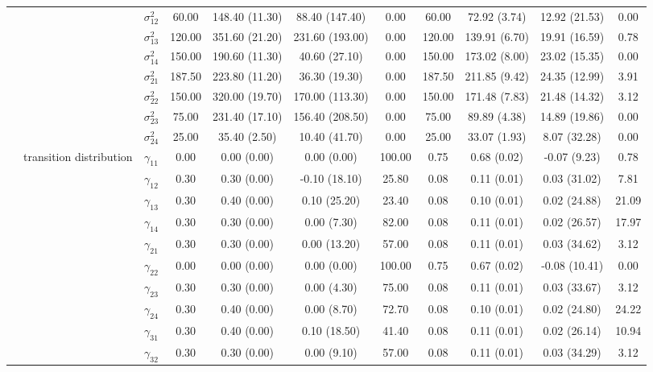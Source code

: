 \begin{table}[h]
{\begin{tabular}{ccccccccccc}
 &  & $\sigma^2_{12}$ & 60.00 & 148.40 (11.30) & 88.40 (147.40) & 0.00 & 60.00 & 72.92 (3.74) & 12.92 (21.53) & 0.00 \\
 &  & $\sigma^2_{13}$ & 120.00 & 351.60 (21.20) & 231.60 (193.00) & 0.00 & 120.00 & 139.91 (6.70) & 19.91 (16.59) & 0.78 \\
 &  & $\sigma^2_{14}$ & 150.00 & 190.60 (11.30) & 40.60 (27.10) & 0.00 & 150.00 & 173.02 (8.00) & 23.02 (15.35) & 0.00 \\
 &  & $\sigma^2_{21}$ & 187.50 & 223.80 (11.20) & 36.30 (19.30) & 0.00 & 187.50 & 211.85 (9.42) & 24.35 (12.99) & 3.91 \\
 &  & $\sigma^2_{22}$ & 150.00 & 320.00 (19.70) & 170.00 (113.30) & 0.00 & 150.00 & 171.48 (7.83) & 21.48 (14.32) & 3.12 \\
 &  & $\sigma^2_{23}$ & 75.00 & 231.40 (17.10) & 156.40 (208.50) & 0.00 & 75.00 & 89.89 (4.38) & 14.89 (19.86) & 0.00 \\
 &  & $\sigma^2_{24}$ & 25.00 & 35.40 (2.50) & 10.40 (41.70) & 0.00 & 25.00 & 33.07 (1.93) & 8.07 (32.28) & 0.00 \\
 & transition distribution & $\gamma_{11}$ & 0.00 & 0.00 (0.00) & 0.00 (0.00) & 100.00 & 0.75 & 0.68 (0.02) & -0.07 (9.23) & 0.78 \\
 & \multirow{15}{*}{} & $\gamma_{12}$ & 0.30 & 0.30 (0.00) & -0.10 (18.10) & 25.80 & 0.08 & 0.11 (0.01) & 0.03 (31.02) & 7.81 \\
 &  & $\gamma_{13}$ & 0.30 & 0.40 (0.00) & 0.10 (25.20) & 23.40 & 0.08 & 0.10 (0.01) & 0.02 (24.88) & 21.09 \\
 &  & $\gamma_{14}$ & 0.30 & 0.30 (0.00) & 0.00 (7.30) & 82.00 & 0.08 & 0.11 (0.01) & 0.02 (26.57) & 17.97 \\
 &  & $\gamma_{21}$ & 0.30 & 0.30 (0.00) & 0.00 (13.20) & 57.00 & 0.08 & 0.11 (0.01) & 0.03 (34.62) & 3.12 \\
 &  & $\gamma_{22}$ & 0.00 & 0.00 (0.00) & 0.00 (0.00) & 100.00 & 0.75 & 0.67 (0.02) & -0.08 (10.41) & 0.00 \\
 &  & $\gamma_{23}$ & 0.30 & 0.30 (0.00) & 0.00 (4.30) & 75.00 & 0.08 & 0.11 (0.01) & 0.03 (33.67) & 3.12 \\
 &  & $\gamma_{24}$ & 0.30 & 0.40 (0.00) & 0.00 (8.70) & 72.70 & 0.08 & 0.10 (0.01) & 0.02 (24.80) & 24.22 \\
 &  & $\gamma_{31}$ & 0.30 & 0.40 (0.00) & 0.10 (18.50) & 41.40 & 0.08 & 0.11 (0.01) & 0.02 (26.14) & 10.94 \\
 &  & $\gamma_{32}$ & 0.30 & 0.30 (0.00) & 0.00 (9.10) & 57.00 & 0.08 & 0.11 (0.01) & 0.03 (34.29) & 3.12 \\

\end{tabular}}
\end{table}
